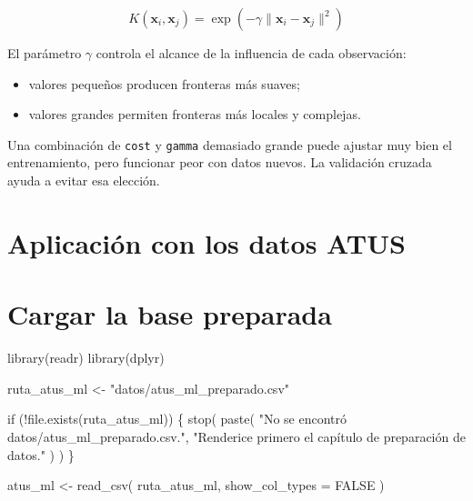 \documentclass[
  spanish,
  10.5pt,
  letterpaper,
  openany,
  headings=big]{scrbook}
\newenvironment{Shaded}{}{}
\newcommand{\AttributeTok}[1]{\textcolor[rgb]{0.84,0.23,0.29}{#1}}
\newcommand{\ConstantTok}[1]{\textcolor[rgb]{0.00,0.36,0.77}{#1}}
\newcommand{\ControlFlowTok}[1]{\textcolor[rgb]{0.84,0.23,0.29}{#1}}
\newcommand{\FunctionTok}[1]{\textcolor[rgb]{0.44,0.26,0.76}{#1}}
\newcommand{\NormalTok}[1]{\textcolor[rgb]{0.14,0.16,0.18}{#1}}
\newcommand{\OtherTok}[1]{\textcolor[rgb]{0.44,0.26,0.76}{#1}}
\newcommand{\SpecialCharTok}[1]{\textcolor[rgb]{0.00,0.36,0.77}{#1}}
\newcommand{\StringTok}[1]{\textcolor[rgb]{0.01,0.18,0.38}{#1}}
\providecommand{\tightlist}{%
  \setlength{\itemsep}{0pt}\setlength{\parskip}{0pt}}
\begin{document}
\[
K(\mathbf{x}_i,\mathbf{x}_j)=
\exp\left(-\gamma\lVert\mathbf{x}_i-\mathbf{x}_j\rVert^2\right)
\]

El parámetro \(\gamma\) controla el alcance de la influencia de cada
observación:

\begin{itemize}
\tightlist
\item
  valores pequeños producen fronteras más suaves;
\item
  valores grandes permiten fronteras más locales y complejas.
\end{itemize}

\begin{tcolorbox}[enhanced jigsaw, arc=.35mm, bottomrule=.15mm, bottomtitle=1mm, breakable, colback=white, colbacktitle=quarto-callout-warning-color!10!white, colframe=quarto-callout-warning-color-frame, coltitle=black, left=2mm, leftrule=.75mm, opacityback=0, opacitybacktitle=0.6, rightrule=.15mm, title=\textcolor{quarto-callout-warning-color}{\faExclamationTriangle}\hspace{0.5em}{Riesgo de sobreajuste}, titlerule=0mm, toprule=.15mm, toptitle=1mm]

Una combinación de \texttt{cost} y \texttt{gamma} demasiado grande puede
ajustar muy bien el entrenamiento, pero funcionar peor con datos nuevos.
La validación cruzada ayuda a evitar esa elección.

\end{tcolorbox}

\section{Aplicación con los datos
ATUS}\label{aplicaciuxf3n-con-los-datos-atus}

\section{Cargar la base preparada}\label{cargar-la-base-preparada}

\begin{Shaded}
\begin{Highlighting}[]
\FunctionTok{library}\NormalTok{(readr)}
\FunctionTok{library}\NormalTok{(dplyr)}

\NormalTok{ruta\_atus\_ml }\OtherTok{\textless{}{-}} \StringTok{"datos/atus\_ml\_preparado.csv"}

\ControlFlowTok{if}\NormalTok{ (}\SpecialCharTok{!}\FunctionTok{file.exists}\NormalTok{(ruta\_atus\_ml)) \{}
  \FunctionTok{stop}\NormalTok{(}
    \FunctionTok{paste}\NormalTok{(}
      \StringTok{"No se encontró datos/atus\_ml\_preparado.csv."}\NormalTok{,}
      \StringTok{"Renderice primero el capítulo de preparación de datos."}
\NormalTok{    )}
\NormalTok{  )}
\NormalTok{\}}

\NormalTok{atus\_ml }\OtherTok{\textless{}{-}} \FunctionTok{read\_csv}\NormalTok{(}
\NormalTok{  ruta\_atus\_ml,}
  \AttributeTok{show\_col\_types =} \ConstantTok{FALSE}
\NormalTok{)}
\end{Highlighting}
\end{Shaded}
\end{document}
